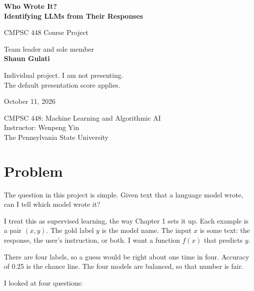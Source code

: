 \documentclass[11pt]{article}
\begin{document}
\begin{titlepage}
\hypersetup{pageanchor=false}
\centering
\vspace*{1.2in}
{\LARGE\bfseries Who Wrote It?\\[0.35em]
Identifying LLMs from Their Responses\par}
\vspace{1.1in}
{\large CMPSC 448 Course Project\par}
\vspace{0.8in}
{\large Team leader and sole member\\[0.4em]
\bfseries Shaun Gulati\par}
\vspace{0.6in}
{\large Individual project. I am not presenting.\\
The default presentation score applies.\par}
\vspace{1.2in}
{\large October 11, 2026\par}
\vfill
{\normalsize CMPSC 448: Machine Learning and Algorithmic AI\\
Instructor: Wenpeng Yin\\
The Pennsylvania State University\par}
\end{titlepage}
\hypersetup{pageanchor=true}

\tableofcontents
\newpage

\section{Problem}
\label{sec:problem}

The question in this project is simple. Given text that a language model wrote, can I tell which model wrote it?

I treat this as supervised learning, the way Chapter 1 sets it up. Each example is a pair $(x, y)$. The gold label $y$ is the model name. The input $x$ is some text: the response, the user's instruction, or both. I want a function $f(x)$ that predicts $y$.

There are four labels, so a guess would be right about one time in four. Accuracy of 0.25 is the chance line. The four models are balanced, so that number is fair.

I looked at four questions:
\end{document}
